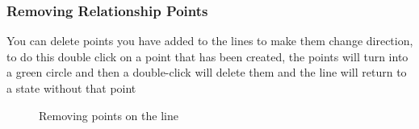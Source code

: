 \documentclass[a4paper]{article}
\begin{document}
\subsubsection{Removing Relationship Points}
You can delete points you have added to the lines to make them change direction, to do this double click on a point that has been created, the points will turn into a green circle and then a double-click will delete them and the line will return to a state without that point
\vspace{-5pt}
\begin{figure}[H]
\begin{center}
 \imagespace
{}
\vspace{-5pt}
\caption{Removing points on the line}
\end{center}
\end{figure}\vspace{-30pt}
\end{document}

